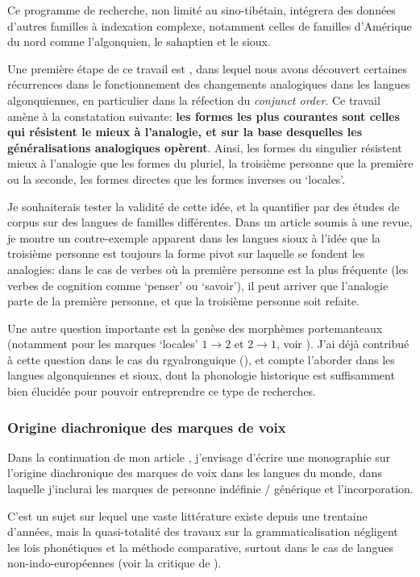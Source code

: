 \documentclass[oldfontcommands,oneside,a4paper,11pt]{article}
\begin{document}
 Ce programme de recherche, non limité au sino-tibétain, intégrera des données d'autres familles à indexation complexe, notamment celles de familles d'Amérique du nord comme l'algonquien, le sahaptien et le sioux. 

Une première étape de ce travail est \citet{jacques15directionality}, dans lequel nous avons découvert certaines récurrences dans le fonctionnement des changements analogiques dans les langues algonquiennes, en particulier dans la réfection du \textit{conjunct order}. Ce travail amène à la constatation suivante:  \textbf{les formes les plus courantes sont celles qui résistent le mieux à l'analogie, et sur la base desquelles les généralisations analogiques opèrent}. Ainsi, les formes du singulier résistent mieux à l'analogie que les formes du pluriel, la troisième personne que la première ou la seconde, les formes directes que les formes inverses ou `locales'.

Je souhaiterais tester la validité de cette idée, et la quantifier par des études de corpus sur des langues de familles différentes. Dans un article soumis à une revue, je montre un contre-exemple apparent dans les langues sioux à l'idée que la troisième personne est toujours la forme pivot sur laquelle se fondent les analogies: dans le cas de verbes où la première personne est la plus fréquente (les verbes de cognition comme `penser' ou `savoir'), il peut arriver que l'analogie parte de la première personne, et que la troisième personne soit refaite.
 
 Une autre question importante est la genèse des morphèmes portemanteaux  (notamment pour les marques `locales' $1\rightarrow2$ et $2\rightarrow1$, voir \citealt{heath98skewing}). J'ai déjà contribué à cette question dans le cas du rgyalronguique (\citealt{jacques15generic}), et compte l'aborder dans les langues algonquiennes et sioux, dont la phonologie historique est suffisamment bien élucidée pour pouvoir entreprendre ce type de recherches. 
 
 
 \subsubsection{Origine diachronique des marques de voix} 
Dans  la continuation de mon article \citet{jacques14antipassive}, j'envisage d'écrire une monographie sur l'origine diachronique des marques de voix dans les langues du monde, dans laquelle j'inclurai les marques de personne indéfinie / générique et l'incorporation.

C'est un sujet sur lequel une vaste littérature  existe depuis une trentaine d'années, mais la quasi-totalité des travaux sur la grammaticalisation négligent les lois phonétiques et la méthode comparative, surtout dans le cas de langues non-indo-européennes (voir la critique de \citealt{heath98hermit}).
\end{document}
